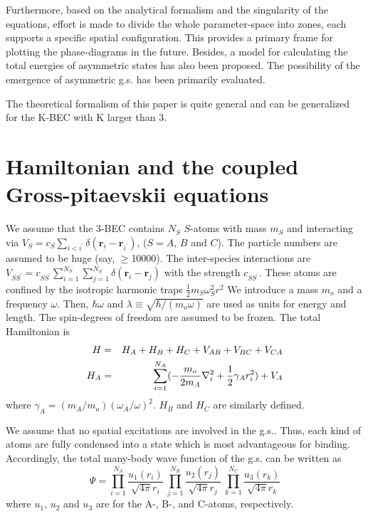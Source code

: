 \documentclass[single-column,showpacs,groupedaddress]{revtex4}
\begin{document}
Furthermore, based on the analytical formalism and the singularity of the
equations, effort is made to divide the whole parameter-space into zones,
each supports a specific spatial configuration. This provides a primary
frame for plotting the phase-diagrams in the future. Besides, a model for
calculating the total energies of asymmetric states has also been proposed.
The possibility of the emergence of asymmetric g.s. has been primarily
evaluated.

The theoretical formalism of this paper is quite general and can be
generalized for the K-BEC with K larger than 3.

\section*{Hamiltonian and the coupled Gross-pitaevskii equations}

We assume that the 3-BEC contains $N_{S}$ $S$-atoms with mass $m_{S}$ and
interacting via $V_{S}=c_{S}\sum_{i<i^{\prime }}\delta (\mathbf{r}_{i}-%
\mathbf{r}_{i^{\prime }})$, ($S=A$, $B$ and $C$). The particle numbers are
assumed to be huge (say, $\geq $10000). The inter-species interactions are $%
V_{SS^{\prime }}=c_{SS^{\prime }}\sum_{i=1}^{N_{S}}\sum_{j=1}^{N_{S^{\prime
}}}\delta (\mathbf{r}_{i}-\mathbf{r}_{j})$ with the strength $c_{SS^{\prime
}}$. These atoms are confined by the isotropic harmonic traps $\frac{1}{2}%
m_{S}\omega _{S}^{2}r^{2}$ We introduce a mass $m_{o}$ and a frequency $%
\omega $. Then, $\hbar \omega $ and $\lambda \equiv \sqrt{\hbar
/(m_{o}\omega )}$ are used as units for energy and length. The spin-degrees
of freedom are assumed to be frozen. The total Hamiltonian is
\begin{eqnarray}
H &=&H_{A}+H_{B}+H_{C}+V_{AB}+V_{BC}+V_{CA}  \notag \\
H_{A} &=&\sum_{i=1}^{N_{A}}(-\frac{m_{o}}{2m_{A}}\nabla _{i}^{2}+\frac{1}{2}%
\gamma _{A}r_{i}^{2})+V_{A}  \label{eq1}
\end{eqnarray}%
where $\gamma _{A}=(m_{A}/m_{o})(\omega _{A}/\omega )^{2}$. $H_{B}$ and $%
H_{C}$ are similarly defined.

We assume that no spatial excitations are involved in the g.s.. Thus, each
kind of atoms are fully condensed into a state which is most advantageous
for binding. Accordingly, the total many-body wave function of the g.s. can
be written as
\begin{equation}
\Psi =\prod_{i=1}^{N_{A}}\frac{u_{1}(r_{i})}{\sqrt{4\pi }r_{i}}\
\prod_{j=1}^{N_{B}}\frac{u_{2}(r_{j})}{\sqrt{4\pi }r_{j}}\
\prod_{k=1}^{N_{C}}\frac{u_{3}(r_{k})}{\sqrt{4\pi }r_{k}}  \label{eq2}
\end{equation}%
where $u_{1}$, $u_{2}$ and $u_{3}$ are for the A-, B-, and C-atoms,
respectively.
\end{document}
